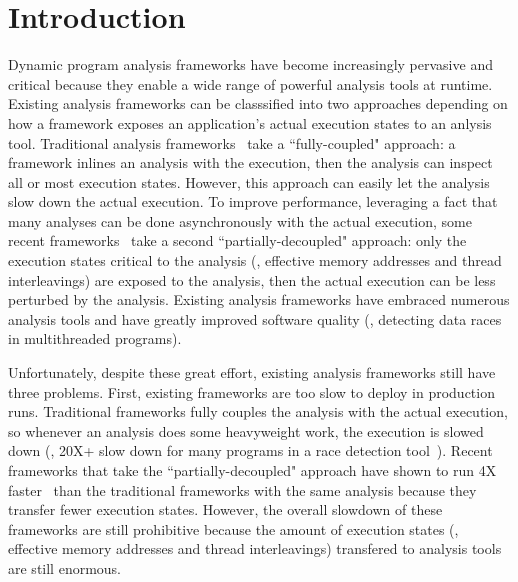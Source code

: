\section{Introduction} \label{sec:intro}



Dynamic program analysis frameworks have become increasingly pervasive and 
critical because they enable a wide range of powerful analysis tools at 
runtime. Existing analysis frameworks can be classsified into two approaches 
depending on how a framework exposes an application's actual execution states 
to an anlysis tool. Traditional analysis frameworks~\cite{dynamorio, pin:pldi05, 
valgrind:pldi, lift:micro06, tsan} take a ``fully-coupled" approach: a framework inlines an 
analysis with the execution, then the analysis can inspect all or most execution 
states. However, this approach can easily let the analysis slow down the actual 
execution. To improve performance, leveraging a fact that many analyses can be 
done asynchronously with the actual execution, some recent 
frameworks~\cite{decouple:usenix08, speck:asplos08, shadowreplica:ccs13, 
wester:parallelizing:asplos13, superpin, jungwoo:oopsla09} take a second ``partially-decoupled" approach: 
only the execution states critical to the analysis (\eg, effective memory 
addresses and thread interleavings) are exposed to the analysis, then the actual 
execution can be less perturbed by the analysis. Existing analysis frameworks 
have embraced numerous analysis tools and have greatly improved software quality 
(\eg, detecting data races in multithreaded programs).



Unfortunately, despite these great effort, existing analysis frameworks still 
have three problems. First, existing frameworks are too slow to deploy in 
production runs. Traditional frameworks fully couples the analysis with the 
actual execution, so whenever an analysis does some heavyweight work, the 
execution is slowed down (\eg, 20X+ slow down for many programs in a race 
detection tool~\cite{tsan}). Recent frameworks that take the 
``partially-decoupled" approach have shown to run 4X 
faster~\cite{shadowreplica:ccs13, wester:parallelizing:asplos13} than the traditional frameworks with the 
same analysis because they transfer fewer execution states. However, the 
overall slowdown of these frameworks are still prohibitive because the amount 
of execution states (\eg, effective memory addresses and thread interleavings) 
transfered to analysis tools are still enormous.


